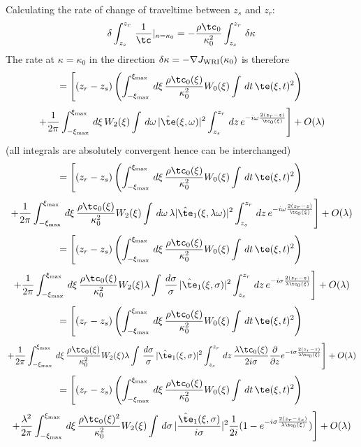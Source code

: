 Calculating the rate of change of traveltime between $z_s$ and $z_r$:
\[
  \delta \int_{z_s}^{z_r}\,\frac{1}{\tc}|_{\kappa=\kappa_0} =
  -\frac{\rho \tc_0}{\kappa_0^2} \int_{z_s}^{z_r}\,\delta \kappa
\]
The rate at $\kappa=\kappa_0$ in the direction $\delta \kappa =
-\nabla J_{\rm WRI}(\kappa_0)$ is therefore
\[
  = \left[(z_r-z_s) \left(\int_{-\xi_{\rm max}}^{\xi_{\rm max}}\,d\xi \, \frac{\rho \tc_0(\xi)}{\kappa_0^2} W_0(\xi)
    \int\,dt\, \te(\xi,t)^2\right)\right.
\]
\[
 \left. +\frac{1}{2\pi}\int_{-\xi_{\rm max}}^{\xi_{\rm max}}\,d\xi\,W_2(\xi)\int\,d\omega\, 
  |\hat{\te}(\xi,\omega)|^2 \int_{z_s}^{z_r}\, dz\,e^{-i\omega\frac{2(z_r-z)}{\tc_0(\xi)}} \right]+ O(\lambda)
\]
(all integrals are absolutely convergent hence can be interchanged)
\[
  = \left[(z_r-z_s) \left(\int_{-\xi_{\rm max}}^{\xi_{\rm max}}\,d\xi \, \frac{\rho \tc_0(\xi)}{\kappa_0^2} W_0(\xi) 
    \int\,dt\, \te(\xi,t)^2\right)\right. 
\]
\[
 \left. +\frac{1}{2\pi}\int_{-\xi_{\rm max}}^{\xi_{\rm max}}\,d\xi\, \frac{\rho \tc_0(\xi)}{\kappa_0^2} W_2(\xi)\int\,d\omega\, 
  \lambda|\hat{\te}_1(\xi,\lambda\omega)|^2 \int_{z_s}^{z_r}\, dz\,e^{-i\omega\frac{2(z_r-z)}{\tc_0(\xi)}} \right]+ O(\lambda) 
\]
\[
  = \left[(z_r-z_s) \left(\int_{-\xi_{\rm max}}^{\xi_{\rm max}}\,d\xi \, \frac{\rho \tc_0(\xi)}{\kappa_0^2} W_0(\xi) 
    \int\,dt\, \te(\xi,t)^2\right)\right. 
\]
\[
 \left. +\frac{1}{2\pi}\int_{-\xi_{\rm max}}^{\xi_{\rm max}}\,d\xi\, \frac{\rho \tc_0(\xi)}{\kappa_0^2} W_2(\xi)\lambda\int\,\frac{d\sigma}{\sigma}\, 
  |\hat{\te}_1(\xi,\sigma)|^2 \int_{z_s}^{z_r}\, dz\,e^{-i\sigma\frac{2(z_r-z)}{\lambda\tc_0(\xi)}} \right]+ O(\lambda) 
\]
\[
  = \left[(z_r-z_s) \left(\int_{-\xi_{\rm max}}^{\xi_{\rm max}}\,d\xi \, \frac{\rho \tc_0(\xi)}{\kappa_0^2} W_0(\xi) 
    \int\,dt\, \te(\xi,t)^2\right)\right. 
\]
\[
 \left. +\frac{1}{2\pi}\int_{-\xi_{\rm max}}^{\xi_{\rm max}}\,d\xi\, \frac{\rho \tc_0(\xi)}{\kappa_0^2} W_2(\xi)\lambda\int\,\frac{d\sigma}{\sigma}\, 
   |\hat{\te}_1(\xi,\sigma)|^2 \int_{z_s}^{z_r}\,
   dz\,\frac{\lambda\tc_0(\xi)}{2i\sigma}\frac{\partial}{\partial
       z}e^{-i\sigma\frac{2(z_r-z)}{\lambda\tc_0(\xi)}} \right]+ O(\lambda) 
\]
\[
  = \left[(z_r-z_s) \left(\int_{-\xi_{\rm max}}^{\xi_{\rm max}}\,d\xi \, \frac{\rho \tc_0(\xi)}{\kappa_0^2} W_0(\xi) 
    \int\,dt\, \te(\xi,t)^2\right)\right. 
\]
\[
 \left. +\frac{\lambda^2}{2\pi}\int_{-\xi_{\rm max}}^{\xi_{\rm max}}\,d\xi\, \frac{\rho \tc_0(\xi)^2}{\kappa_0^2} W_2(\xi)\int\,d\sigma\, 
   |\frac{\hat{\te}_1(\xi,\sigma)}{i\sigma}|^2 \frac{1}{2i}(1-e^{-i\sigma\frac{2(z_r-z_s)}{\lambda\tc_0(\xi)}}) \right]+ O(\lambda) 
\]

